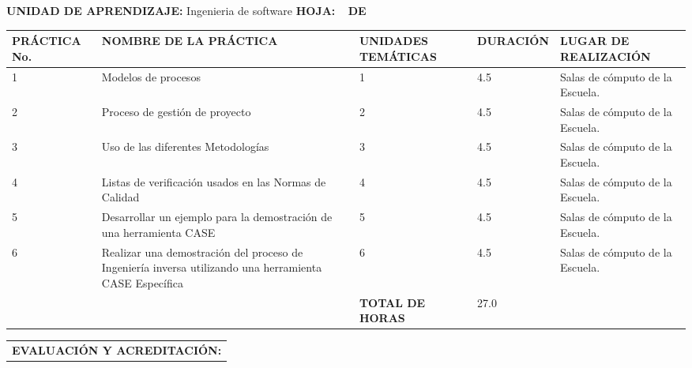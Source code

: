 \documentclass[10pt]{article}
\newcommand\tab[1][1cm]{\hspace*{#1}}
\begin{document}
\textbf{UNIDAD DE APRENDIZAJE:} Ingenieria de software
\tab[1cm]
\textbf{HOJA: } \thepage\
\tab[0.25cm]
\textbf{DE } \pageref{LastPage}\\
\begin{center}
\end{center}
\begin{table}[H]
  \begin{tabular}{|p{}|p{}|p{}|p{}|p{}|}
    \hline
    \Centering\textbf{PRÁCTICA No.} & \Centering\textbf{NOMBRE DE LA PRÁCTICA} & \Centering\textbf{UNIDADES TEMÁTICAS} & \Centering\textbf{DURACIÓN} & \Centering\textbf{LUGAR DE REALIZACIÓN}\\
    \hline 
    1&Modelos de procesos&1&4.5&Salas de cómputo de la Escuela.\\2&Proceso de gestión de proyecto&2&4.5&Salas de cómputo de la Escuela.\\3&Uso de las diferentes Metodologías&3&4.5&Salas de cómputo de la Escuela.\\4&Listas de verificación usados en las Normas de Calidad&4&4.5&Salas de cómputo de la Escuela.\\5&Desarrollar un ejemplo para la demostración de una herramienta CASE&5&4.5&Salas de cómputo de la Escuela.\\6&Realizar una demostración del proceso de Ingeniería inversa utilizando una herramienta CASE Específica&6&4.5&Salas de cómputo de la Escuela.\\
    \hline &&\Centering\textbf{TOTAL DE HORAS}& 27.0 &\\\hline 
  \end{tabular}
  \begin{tabular}{|p{1.045\textwidth}|}
    \textbf{EVALUACIÓN Y ACREDITACIÓN:}


\end{tabular}
\end{table}
\end{document}
